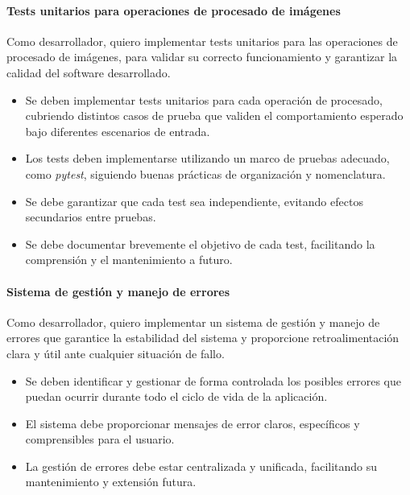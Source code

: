 \paragraph{Tests unitarios para operaciones de procesado de imágenes} \label{hist:tests_unitarios_operaciones_procesado}
Como desarrollador, quiero implementar tests unitarios para las operaciones de procesado de imágenes, 
para validar su correcto funcionamiento y garantizar la calidad del software desarrollado.

\begin{itemize}[noitemsep]
	\item Se deben implementar tests unitarios para cada operación de procesado, cubriendo distintos casos de prueba que validen el comportamiento esperado bajo diferentes escenarios de entrada.
	\item Los tests deben implementarse utilizando un marco de pruebas adecuado, como \textit{pytest}, siguiendo buenas prácticas de organización y nomenclatura.
	\item Se debe garantizar que cada test sea independiente, evitando efectos secundarios entre pruebas.
	\item Se debe documentar brevemente el objetivo de cada test, facilitando la comprensión y el mantenimiento a futuro.
\end{itemize}
\paragraph{Sistema de gestión y manejo de errores} \label{hist:gestion_errores}
Como desarrollador, quiero implementar un sistema de gestión y manejo de errores que garantice la estabilidad 
del sistema y proporcione retroalimentación clara y útil ante cualquier situación de fallo.

\begin{itemize}[noitemsep]
	\item Se deben identificar y gestionar de forma controlada los posibles errores que puedan ocurrir durante todo el ciclo de vida de la aplicación.
	\item El sistema debe proporcionar mensajes de error claros, específicos y comprensibles para el usuario.
	\item La gestión de errores debe estar centralizada y unificada, facilitando su mantenimiento y extensión futura.
\end{itemize}

\newpage


